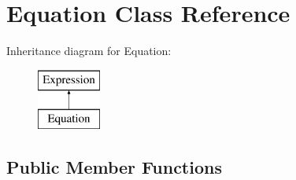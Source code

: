 \hypertarget{class_equation}{}\section{Equation Class Reference}
\label{class_equation}
Inheritance diagram for Equation\+:\begin{figure}[H]
\begin{center}
\leavevmode
\includegraphics[height=2.000000cm]{class_equation}
\end{center}
\end{figure}
\subsection*{Public Member Functions}
